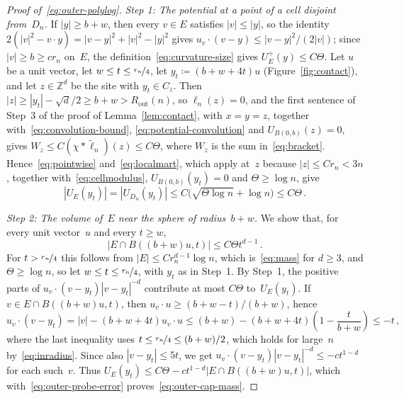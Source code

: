 \documentclass[11pt]{amsart}
\theoremstyle{plain}
\theoremstyle{definition}
\newcommand{\Z}{\mathbb Z}
\newcommand{\nf}{\nicefrac}
\newcommand{\Rout}{R_{\mathrm{out}}}
\numberwithin{equation}{section}
\begin{document}
\begin{proof}[Proof of~\eqref{eq:outer-polylog}]
\emph{Step 1: The potential at a point of a cell disjoint from~$D_n$.} If $|y|\geq b+w$, then every $v\in E$ satisfies $|v|\leq|y|$, so the identity $2(|v|^2-v\cdot y)=|v-y|^2+|v|^2-|y|^2$ gives $u_v\cdot(v-y)\leq|v-y|^2/(2|v|)$; since $|v|\geq b\geq cr_n$ on~$E$, the definition~\eqref{eq:curvature-size} gives $U_E^+(y)\leq C\Theta$. Let $u$ be a unit vector, let $w\leq t\leq\nf{r_n}{4}$, let $y_t\coloneqq(b+w+4t)u$ (Figure~\ref{fig:contact}), and let $z\in\Z^d$ be the site with $y_t\in C_z$. Then $|z|\geq|y_t|-\sqrt d/2\geq b+w>\Rout(n)$, so $\ell_n(z)=0$, and the first sentence of Step~3 of the proof of Lemma~\ref{lem:contact}, with $x=y=z$, together with~\eqref{eq:convolution-bound}, \eqref{eq:potential-convolution} and $U_{B(0,b)}(z)=0$, gives $W_z\leq C(\chi*\widetilde\ell_n)(z)\leq C\Theta$, where $W_z$ is the sum in~\eqref{eq:bracket}. Hence~\eqref{eq:pointwise} and~\eqref{eq:localmart}, which apply at~$z$ because $|z|\leq Cr_n<3n$, together with~\eqref{eq:cellmodulus}, $U_{B(0,b)}(y_t)=0$ and $\Theta\geq\log n$, give
\begin{equation}\label{eq:outer-probe-error}
|U_E(y_t)|=|U_{D_n}(y_t)|\leq C\bigl(\sqrt{\Theta\log n}+\log n\bigr)\leq C\Theta\, .
\end{equation}

\emph{Step 2: The volume of~$E$ near the sphere of radius~$b+w$.} We show that, for every unit vector~$u$ and every $t\geq w$,
\begin{equation}\label{eq:outer-cap-mass}
|E\cap B((b+w)u,t)|\leq C\Theta t^{d-1}\, .
\end{equation}
For $t>\nf{r_n}{4}$ this follows from $|E|\leq Cr_n^{d-1}\log n$, which is~\eqref{eq:mass} for $d\geq3$, and $\Theta\geq\log n$, so let $w\leq t\leq\nf{r_n}{4}$, with $y_t$ as in Step~1. By Step~1, the positive parts of $u_v\cdot(v-y_t)|v-y_t|^{-d}$ contribute at most $C\Theta$ to~$U_E(y_t)$. If $v\in E\cap B((b+w)u,t)$, then $u_v\cdot u\geq(b+w-t)/(b+w)$, hence
\begin{equation*}
u_v\cdot(v-y_t)=|v|-(b+w+4t)u_v\cdot u
\leq(b+w)-(b+w+4t)\left(1-\frac t{b+w}\right)\leq-t\, ,
\end{equation*}
where the last inequality uses $t\leq\nf{r_n}{4}\leq(b+w)/2$, which holds for large~$n$ by~\eqref{eq:inradius}. Since also $|v-y_t|\leq5t$, we get $u_v\cdot(v-y_t)|v-y_t|^{-d}\leq-ct^{1-d}$ for each such~$v$. Thus $U_E(y_t)\leq C\Theta-ct^{1-d}|E\cap B((b+w)u,t)|$, which with~\eqref{eq:outer-probe-error} proves~\eqref{eq:outer-cap-mass}.


\end{proof}
\end{document}
